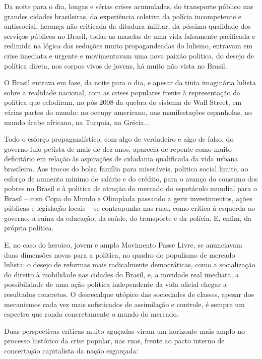 Da noite para o dia, longas e sérias crises acumuladas, do transporte
público nas grandes cidades brasileiras, da experiência coletiva da
polícia incompetente e antissocial, herança não criticada da ditadura
militar, da péssima qualidade dos serviços públicos no Brasil, todas as
mazelas de uma vida falsamente pacificada e redimida na lógica das
seduções muito propagandeadas do lulismo, entravam em crise imediata e
urgente e movimentavam uma nova paixão politica, do desejo de política
direta, nos corpos vivos de jovens, há muito não vista no Brasil.

O Brasil entrava em fase, da noite para o dia, e apesar da tinta
imaginária lulista sobre a realidade nacional, com as crises populares
frente à representação da política que eclodiram, no pós 2008 da quebra
do sistema de Wall Street, em várias partes do mundo: no occupy
americano, nas manifestações espanholas, no mundo árabe africano, na
Turquia, na Grécia...

Todo o esforço propagandístico, com algo de verdadeiro e algo de falso,
do governo lulo-petista de mais de dez anos, aparecia de repente como
muito deficitário em relação às aspirações de cidadania qualificada da
vida urbana brasileira. Aos trocos do bolsa família para miseráveis,
politica social limite, ao esforço de aumento mínimo de salário e do
crédito, para o avanço do consumo dos pobres no Brasil e à politica de
atração do mercado do espetáculo mundial para o Brasil -- com Copa do
Mundo e Olimpíada passando a gerir investimentos, ações públicas e
legislação locais -- se contrapunha nas ruas, como crítica à esquerda ao
governo, a ruína da educação, da saúde, do transporte e da polícia. E,
enfim, da própria política.

E, no caso do heroico, jovem e amplo Movimento Passe Livre, se
anunciavam duas dimensões novas para a política, no quadro do populismo
de mercado lulista: o desejo de reformas mais radicalmente democráticas,
como a socialização do direito à mobilidade nas cidades do Brasil, e, a
novidade real imediata, a possibilidade de uma ação política
independente da vida oficial chegar a resultados concretos. O
desrecalque utópico das sociedades de classes, apesar dos mecanismos
cada vez mais sofisticados de assimilação e controle, é sempre um
espectro que ronda concretamente o mundo do mercado.

Duas perspectivas críticas muito aguçadas viram um horizonte mais amplo
no processo histórico da crise popular, nas ruas, frente ao pacto
interno de concertação capitalista da nação esgarçada:

